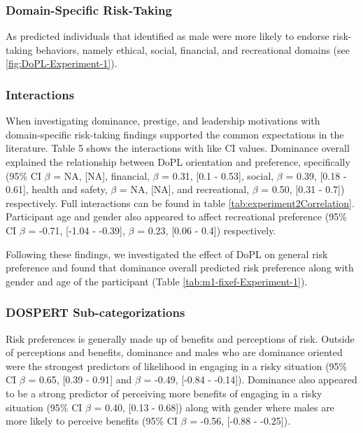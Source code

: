 \documentclass[
  donotrepeattitle,doc, 12pt, a4paper,floatsintext]{apa7}
\begin{document}
\hypertarget{domain-specific-risk-taking}{%
\subsubsection{Domain-Specific Risk-Taking}\label{domain-specific-risk-taking}}

As predicted individuals that identified as male were more likely to endorse risk-taking behaviors, namely ethical, social, financial, and recreational domains (see \ref{fig:DoPL-Experiment-1}).

\hypertarget{interactions}{%
\subsubsection{Interactions}\label{interactions}}

When investigating dominance, prestige, and leadership motivations with domain-specific risk-taking findings supported the common expectations in the literature. Table 5 shows the interactions with like CI values. Dominance overall explained the relationship between DoPL orientation and preference, specifically (95\% CI \(\beta\) = NA, {[}NA{]}, financial, \(\beta\) = 0.31, {[}0.1 - 0.53{]}, social, \(\beta\) = 0.39, {[}0.18 - 0.61{]}, health and safety, \(\beta\) = NA, {[}NA{]}, and recreational, \(\beta\) = 0.50, {[}0.31 - 0.7{]}) respectively. Full interactions can be found in table \ref{tab:experiment2Correlation}. Participant age and gender also appeared to affect recreational preference (95\% CI \(\beta\) = -0.71, {[}-1.04 - -0.39{]}, \(\beta\) = 0.23, {[}0.06 - 0.4{]}) respectively.

Following these findings, we investigated the effect of DoPL on general risk preference and found that dominance overall predicted risk preference along with gender and age of the participant (Table \ref{tab:m1-fixef-Experiment-1}).

\hypertarget{dospert-sub-categorizations}{%
\subsubsection{DOSPERT Sub-categorizations}\label{dospert-sub-categorizations}}

Risk preferences is generally made up of benefits and perceptions of risk. Outside of perceptions and benefits, dominance and males who are dominance oriented were the strongest predictors of likelihood in engaging in a risky situation (95\% CI \(\beta\) = 0.65, {[}0.39 - 0.91{]} and \(\beta\) = -0.49, {[}-0.84 - -0.14{]}). Dominance also appeared to be a strong predictor of perceiving more benefits of engaging in a risky situation (95\% CI \(\beta\) = 0.40, {[}0.13 - 0.68{]}) along with gender where males are more likely to perceive benefits (95\% CI \(\beta\) = -0.56, {[}-0.88 - -0.25{]}).
\end{document}
